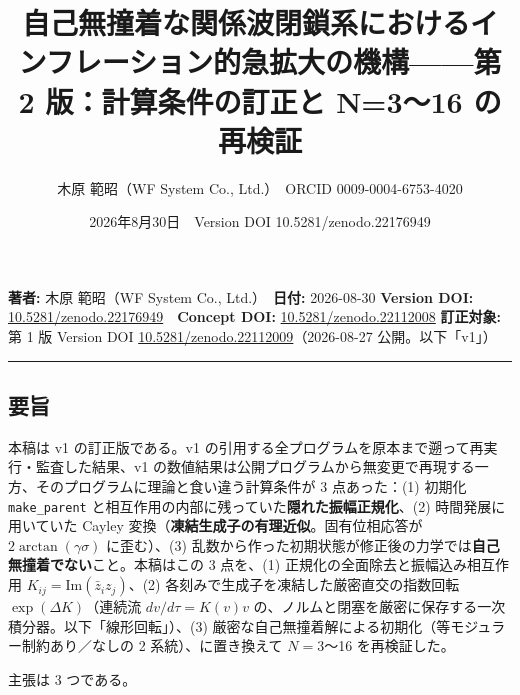 \documentclass[
  10pt,
  a4paper,
]{ltjsarticle}
\title{自己無撞着な関係波閉鎖系におけるインフレーション的急拡大の機構------第
2 版：計算条件の訂正と N=3〜16 の再検証}
\author{木原 範昭（WF System Co., Ltd.）　ORCID 0009-0004-6753-4020}
\date{2026年8月30日　Version DOI 10.5281/zenodo.22176949}
\begin{document}
\maketitle

{
\setcounter{tocdepth}{2}
\tableofcontents
}
\textbf{著者:} 木原 範昭（WF System Co., Ltd.）　\textbf{日付:}
2026-08-30 \textbf{Version DOI:}
\href{https://doi.org/10.5281/zenodo.22176949}{10.5281/zenodo.22176949}　\textbf{Concept
DOI:}
\href{https://doi.org/10.5281/zenodo.22112008}{10.5281/zenodo.22112008}
\textbf{訂正対象:} 第 1 版 Version DOI
\href{https://doi.org/10.5281/zenodo.22112009}{10.5281/zenodo.22112009}（2026-08-27
公開。以下「v1」）

\begin{center}\rule{0.5\linewidth}{0.5pt}\end{center}

\subsection{要旨}\label{ux8981ux65e8}

本稿は v1 の訂正版である。v1
の引用する全プログラムを原本まで遡って再実行・監査した結果、v1
の数値結果は公開プログラムから無変更で再現する一方、そのプログラムに理論と食い違う計算条件が
3 点あった：(1) 初期化 \texttt{make\_parent}
と相互作用の内部に残っていた\textbf{隠れた振幅正規化}、(2)
時間発展に用いていた Cayley
変換（\textbf{凍結生成子の有理近似}。固有位相応答が
\(2\arctan(\gamma\sigma)\) に歪む）、(3)
乱数から作った初期状態が修正後の力学では\textbf{自己無撞着でない}こと。本稿はこの
3 点を、(1) 正規化の全面除去と振幅込み相互作用
\(K_{ij}=\mathrm{Im}(\bar z_i z_j)\)、(2)
各刻みで生成子を凍結した厳密直交の指数回転 \(\exp(\Delta K)\)（連続流
\(dv/d\tau=K(v)v\)
の、ノルムと閉塞を厳密に保存する一次積分器。以下「線形回転」）、(3)
厳密な自己無撞着解による初期化（等モジュラー制約あり／なしの 2
系統）、に置き換えて \(N=3\)〜16 を再検証した。

主張は 3 つである。
\end{document}
